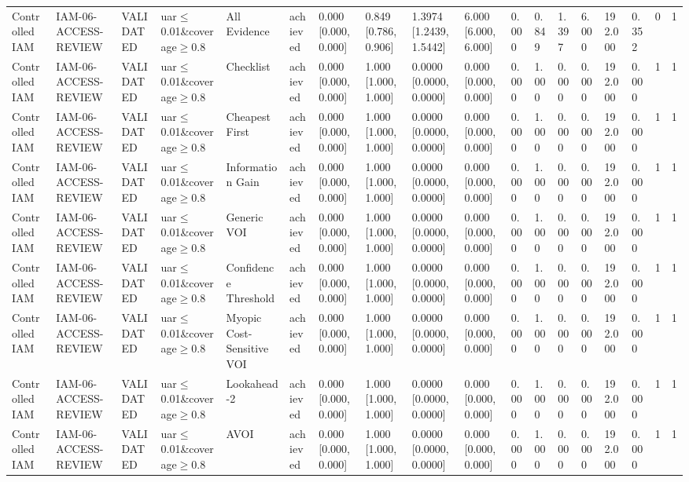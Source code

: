 \begin{table}[!ht]
{\begin{tabular}{llllllllllllllllll}
Controlled IAM & IAM-06-ACCESS-REVIEW & VALIDATED & uar$\le$0.01\&coverage$\ge$0.8 & All Evidence & achieved & 0.000 [0.000, 0.000] & 0.849 [0.786, 0.906] & 1.3974 [1.2439, 1.5442] & 6.000 [6.000, 6.000] & 0.000 & 0.849 & 1.397 & 6.000 & 192.000 & 0.352 & 0 & 1 \\
Controlled IAM & IAM-06-ACCESS-REVIEW & VALIDATED & uar$\le$0.01\&coverage$\ge$0.8 & Checklist & achieved & 0.000 [0.000, 0.000] & 1.000 [1.000, 1.000] & 0.0000 [0.0000, 0.0000] & 0.000 [0.000, 0.000] & 0.000 & 1.000 & 0.000 & 0.000 & 192.000 & 0.000 & 1 & 1 \\
Controlled IAM & IAM-06-ACCESS-REVIEW & VALIDATED & uar$\le$0.01\&coverage$\ge$0.8 & Cheapest First & achieved & 0.000 [0.000, 0.000] & 1.000 [1.000, 1.000] & 0.0000 [0.0000, 0.0000] & 0.000 [0.000, 0.000] & 0.000 & 1.000 & 0.000 & 0.000 & 192.000 & 0.000 & 1 & 1 \\
Controlled IAM & IAM-06-ACCESS-REVIEW & VALIDATED & uar$\le$0.01\&coverage$\ge$0.8 & Information Gain & achieved & 0.000 [0.000, 0.000] & 1.000 [1.000, 1.000] & 0.0000 [0.0000, 0.0000] & 0.000 [0.000, 0.000] & 0.000 & 1.000 & 0.000 & 0.000 & 192.000 & 0.000 & 1 & 1 \\
Controlled IAM & IAM-06-ACCESS-REVIEW & VALIDATED & uar$\le$0.01\&coverage$\ge$0.8 & Generic VOI & achieved & 0.000 [0.000, 0.000] & 1.000 [1.000, 1.000] & 0.0000 [0.0000, 0.0000] & 0.000 [0.000, 0.000] & 0.000 & 1.000 & 0.000 & 0.000 & 192.000 & 0.000 & 1 & 1 \\
Controlled IAM & IAM-06-ACCESS-REVIEW & VALIDATED & uar$\le$0.01\&coverage$\ge$0.8 & Confidence Threshold & achieved & 0.000 [0.000, 0.000] & 1.000 [1.000, 1.000] & 0.0000 [0.0000, 0.0000] & 0.000 [0.000, 0.000] & 0.000 & 1.000 & 0.000 & 0.000 & 192.000 & 0.000 & 1 & 1 \\
Controlled IAM & IAM-06-ACCESS-REVIEW & VALIDATED & uar$\le$0.01\&coverage$\ge$0.8 & Myopic Cost-Sensitive VOI & achieved & 0.000 [0.000, 0.000] & 1.000 [1.000, 1.000] & 0.0000 [0.0000, 0.0000] & 0.000 [0.000, 0.000] & 0.000 & 1.000 & 0.000 & 0.000 & 192.000 & 0.000 & 1 & 1 \\
Controlled IAM & IAM-06-ACCESS-REVIEW & VALIDATED & uar$\le$0.01\&coverage$\ge$0.8 & Lookahead-2 & achieved & 0.000 [0.000, 0.000] & 1.000 [1.000, 1.000] & 0.0000 [0.0000, 0.0000] & 0.000 [0.000, 0.000] & 0.000 & 1.000 & 0.000 & 0.000 & 192.000 & 0.000 & 1 & 1 \\
Controlled IAM & IAM-06-ACCESS-REVIEW & VALIDATED & uar$\le$0.01\&coverage$\ge$0.8 & AVOI & achieved & 0.000 [0.000, 0.000] & 1.000 [1.000, 1.000] & 0.0000 [0.0000, 0.0000] & 0.000 [0.000, 0.000] & 0.000 & 1.000 & 0.000 & 0.000 & 192.000 & 0.000 & 1 & 1 \\

\end{tabular}}
\end{table}
